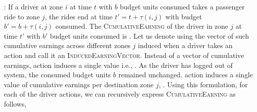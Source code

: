 :
If a driver at zone $i$ at time $t$ with $b$ budget units consumed takes a passenger ride to zone $j$, the rides end at time 
$t' = t + \tau(i,j)$ with budget $b' = b + \tau(i,j)$ consumed. The \textsc{CumulativeEarning} of the driver in zone $j$ at time $t'$ with $b'$
budget units consumed is {}. Let us denote using {} the vector of such
cumulative earnings across different zones $j$ induced when a driver takes an action {\getpassengeraction} and call it an 
\textsc{InducedEarningVector}. Instead of a vector of cumulative earnings, {\gohome} action induces a single value i.e., {}. 
As the driver has logged out of system, the consumed budget units $b$ remained unchanged. {\relocate} action induces a single value of cumulative earnings per destination zone $j$, {}. 
Using this formulation, for each of the driver actions, we can recursively express \textsc{CumulativeEarning} as follows,
